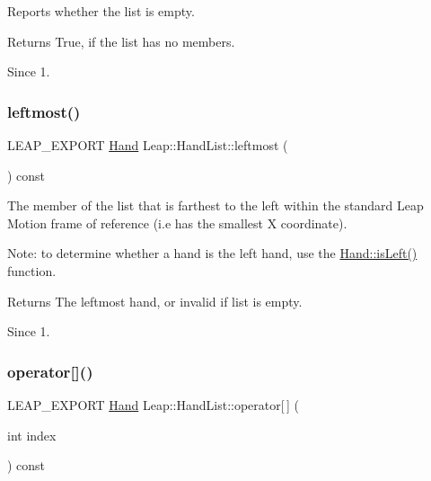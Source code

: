 Reports whether the list is empty.


\begin{DoxyCodeInclude}
\end{DoxyCodeInclude}


\begin{DoxyReturn}{Returns}
True, if the list has no members. 
\end{DoxyReturn}
\begin{DoxySince}{Since}
1. 
\end{DoxySince}
\mbox{\label{class_leap_1_1_hand_list_a8b2fc4b411614212be1ea71f3844e8c5}} 
\subsubsection{\texorpdfstring{leftmost()}{leftmost()}}
{\footnotesize\ttfamily L\+E\+A\+P\+\_\+\+E\+X\+P\+O\+RT \hyperlink{class_leap_1_1_hand}{Hand} Leap\+::\+Hand\+List\+::leftmost (\begin{DoxyParamCaption}{ }\end{DoxyParamCaption}) const}

The member of the list that is farthest to the left within the standard Leap Motion frame of reference (i.\+e has the smallest X coordinate).

Note\+: to determine whether a hand is the left hand, use the \hyperlink{class_leap_1_1_hand_a97a82aa4c1ca8ef138fc8d9939b017d8}{Hand\+::is\+Left()} function.


\begin{DoxyCodeInclude}
\end{DoxyCodeInclude}


\begin{DoxyReturn}{Returns}
The leftmost hand, or invalid if list is empty. 
\end{DoxyReturn}
\begin{DoxySince}{Since}
1. 
\end{DoxySince}
\mbox{\label{class_leap_1_1_hand_list_a83ae24fb8d7f7e7acfa5edbcfdd2c87c}} 
\subsubsection{\texorpdfstring{operator[]()}{operator[]()}}
{\footnotesize\ttfamily L\+E\+A\+P\+\_\+\+E\+X\+P\+O\+RT \hyperlink{class_leap_1_1_hand}{Hand} Leap\+::\+Hand\+List\+::operator\mbox{[}$\,$\mbox{]} (\begin{DoxyParamCaption}\item[{int}]{index }\end{DoxyParamCaption}) const}

